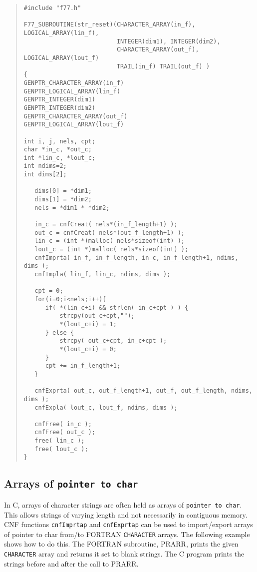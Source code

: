 \documentclass[twoside,11pt]{article}
\newcommand{\htmlref}[2]{#1}
\newcommand{\xlabel}[1]{}
\renewcommand{\_}{\texttt{\symbol{95}}}
\begin{document}
{\small \begin{quote} \begin{verbatim}
#include "f77.h"

F77_SUBROUTINE(str_reset)(CHARACTER_ARRAY(in_f), LOGICAL_ARRAY(lin_f),
                          INTEGER(dim1), INTEGER(dim2),
                          CHARACTER_ARRAY(out_f), LOGICAL_ARRAY(lout_f)
                          TRAIL(in_f) TRAIL(out_f) )
{
GENPTR_CHARACTER_ARRAY(in_f)
GENPTR_LOGICAL_ARRAY(lin_f)
GENPTR_INTEGER(dim1)
GENPTR_INTEGER(dim2)
GENPTR_CHARACTER_ARRAY(out_f)
GENPTR_LOGICAL_ARRAY(lout_f)

int i, j, nels, cpt;
char *in_c, *out_c;
int *lin_c, *lout_c;
int ndims=2;
int dims[2];

   dims[0] = *dim1;
   dims[1] = *dim2;
   nels = *dim1 * *dim2;
   
   in_c = cnfCreat( nels*(in_f_length+1) );
   out_c = cnfCreat( nels*(out_f_length+1) );
   lin_c = (int *)malloc( nels*sizeof(int) );
   lout_c = (int *)malloc( nels*sizeof(int) );
   cnfImprta( in_f, in_f_length, in_c, in_f_length+1, ndims, dims );
   cnfImpla( lin_f, lin_c, ndims, dims );

   cpt = 0;
   for(i=0;i<nels;i++){
      if( *(lin_c+i) && strlen( in_c+cpt ) ) {
          strcpy(out_c+cpt,"");
          *(lout_c+i) = 1;
      } else {
          strcpy( out_c+cpt, in_c+cpt );
          *(lout_c+i) = 0;
      }
      cpt += in_f_length+1;
   }

   cnfExprta( out_c, out_f_length+1, out_f, out_f_length, ndims, dims );
   cnfExpla( lout_c, lout_f, ndims, dims );

   cnfFree( in_c );
   cnfFree( out_c );
   free( lin_c );
   free( lout_c );
}
\end{verbatim} \end{quote} }

\subsection{\xlabel{arrays_of_pointer_to_char}\label{char_ptrs}Arrays of \texttt{pointer to char}}
In C, arrays of character strings are often held as arrays of 
\texttt{pointer to char}.
This allows strings of varying length and not necessarily in contiguous
memory.
CNF functions
\htmlref{\texttt{cnfImprtap}}{cnfImprtap}
and
\htmlref{\texttt{cnfExprtap}}{cnfExprtap}
can be used to import/export arrays of pointer to char from/to 
FORTRAN \texttt{CHARACTER} arrays.
The following example shows how to do this. The FORTRAN subroutine, PRARR,
prints the given \texttt{CHARACTER} array and returns it set to blank strings.
The C program prints the strings before and after the call to PRARR.
\end{document}
